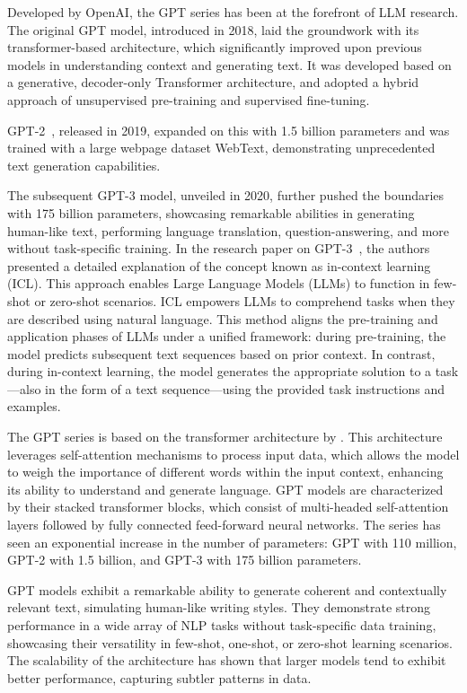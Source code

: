 Developed by OpenAI, the GPT series has been at the forefront of LLM research.
The original GPT model, introduced in 2018, laid the groundwork with its transformer-based architecture, which significantly improved upon previous models in understanding context and generating text.
It was developed based on a generative, decoder-only Transformer architecture, and adopted a hybrid approach of unsupervised pre-training and supervised fine-tuning.

GPT-2~\cite{radford2019language}, released in 2019, expanded on this with 1.5 billion parameters and was trained with a large webpage dataset WebText, demonstrating unprecedented text generation capabilities.

The subsequent GPT-3 model, unveiled in 2020, further pushed the boundaries with 175 billion parameters, showcasing remarkable abilities in generating human-like text, performing language translation, question-answering, and more without task-specific training.
In the research paper on GPT-3~\cite{brown2020language}, the authors presented a detailed explanation of the concept known as in-context learning (ICL). This approach enables Large Language Models (LLMs) to function in few-shot or zero-shot scenarios.
ICL empowers LLMs to comprehend tasks when they are described using natural language.
This method aligns the pre-training and application phases of LLMs under a unified framework: during pre-training, the model predicts subsequent text sequences based on prior context.
In contrast, during in-context learning, the model generates the appropriate solution to a task—also in the form of a text sequence—using the provided task instructions and examples.

The GPT series is based on the transformer architecture by \textcite{vaswani2023attention}.
This architecture leverages self-attention mechanisms to process input data, which allows the model to weigh the importance of different words within the input context, enhancing its ability to understand and generate language.
GPT models are characterized by their stacked transformer blocks, which consist of multi-headed self-attention layers followed by fully connected feed-forward neural networks.
The series has seen an exponential increase in the number of parameters: GPT with 110 million, GPT-2 with 1.5 billion, and GPT-3 with 175 billion parameters.

GPT models exhibit a remarkable ability to generate coherent and contextually relevant text, simulating human-like writing styles.
They demonstrate strong performance in a wide array of NLP tasks without task-specific data training, showcasing their versatility in few-shot, one-shot, or zero-shot learning scenarios.
The scalability of the architecture has shown that larger models tend to exhibit better performance, capturing subtler patterns in data.

